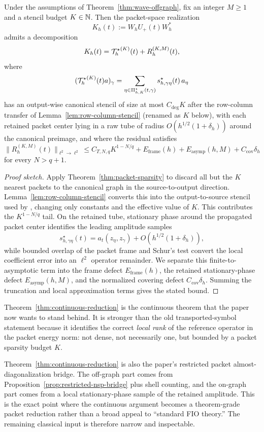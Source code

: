 \begin{theorem}
\label{thm:continuous-reduction}
Under the assumptions of Theorem~\ref{thm:wave-offgraph}, fix an integer $M\ge 1$ and a stencil budget $K\in\mathbb N$. Then the packet-space realization
\[
K_h(t):=W_h U_+(t) W_h^\ast
\]
admits a decomposition
\[
K_h(t)={\mathcal T^\star_h}^{(K)}(t)+R_h^{(K,M)}(t),
\]
where
\[
({\mathcal T^\star_h}^{(K)}(t)a)_\gamma
=
\sum_{\eta\in\Pi^\star_{h,K}(t,\gamma)}
s_{h,\gamma\eta}^\star(t)\,a_\eta
\]
has an output-wise canonical stencil of size at most $C_{\mathrm{deg}}K$ after the row-column transfer of Lemma~\ref{lem:row-column-stencil} (renamed as $K$ below), with each retained packet center lying in a raw tube of radius $O(h^{1/2}(1+\delta_h))$ around the canonical preimage, and where the residual satisfies
\[
\|R_h^{(K,M)}(t)\|_{\ell^2\to\ell^2}
\le
C_{T,N,q}K^{1-N/q}
+E_{\mathrm{frame}}(h)+E_{\mathrm{asymp}}(h,M)+C_{\mathrm{cov}}\delta_h
\]
for every $N>q+1$.
\end{theorem}

\begin{proof}[Proof sketch]
Apply Theorem~\ref{thm:packet-sparsity} to discard all but the $K$ nearest packets to the canonical graph in the source-to-output direction. Lemma~\ref{lem:row-column-stencil} converts this into the output-to-source stencil used by \MiNO, changing only constants and the effective value of $K$. This contributes the $K^{1-N/q}$ tail. On the retained tube, stationary phase around the propagated packet center identifies the leading amplitude samples
\[
s_{h,\gamma\eta}^\star(t)
=
a_t(z_\eta,z_\gamma)+O(h^{1/2}(1+\delta_h)),
\]
while bounded overlap of the packet frame and Schur's test convert the local coefficient error into an $\ell^2$ operator remainder.  We separate this finite-to-asymptotic term into the frame defect $E_{\mathrm{frame}}(h)$, the retained stationary-phase defect $E_{\mathrm{asymp}}(h,M)$, and the normalized covering defect $C_{\mathrm{cov}}\delta_h$. Summing the truncation and local approximation terms gives the stated bound.
\end{proof}

Theorem~\ref{thm:continuous-reduction} is the continuous theorem that the paper now wants to stand behind. It is stronger than the old transported-symbol statement because it identifies the correct \emph{local rank} of the reference operator in the packet energy norm: not dense, not necessarily one, but bounded by a packet sparsity budget $K$.

Theorem~\ref{thm:continuous-reduction} is also the paper's restricted packet almost-diagonalization bridge. The off-graph part comes from Proposition~\ref{prop:restricted-nsp-bridge} plus shell counting, and the on-graph part comes from a local stationary-phase sample of the retained amplitude. This is the exact point where the continuous argument becomes a theorem-grade packet reduction rather than a broad appeal to ``standard FIO theory.'' The remaining classical input is therefore narrow and inspectable.

